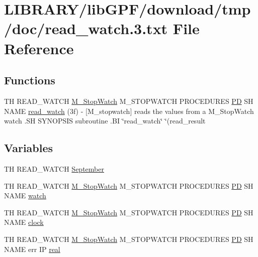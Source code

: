 \hypertarget{read__watch_83_8txt}{}\section{L\+I\+B\+R\+A\+R\+Y/lib\+G\+P\+F/download/tmp/doc/read\+\_\+watch.3.txt File Reference}
\label{read__watch_83_8txt}
\subsection*{Functions}
\begin{DoxyCompactItemize}
\item 
TH R\+E\+A\+D\+\_\+\+W\+A\+T\+CH \hyperlink{option__stopwatch_83_8txt_aa2011fc45a5e502e87ee50996a8a9305}{M\+\_\+\+Stop\+Watch} M\+\_\+\+S\+T\+O\+P\+W\+A\+T\+CH P\+R\+O\+C\+E\+D\+U\+R\+ES \hyperlink{what__overview_81_8txt_a85f26da5a4481fbdb0d9c79f2b94de3e}{PD} SH N\+A\+ME \hyperlink{read__watch_83_8txt_a9a59c617348dee220b1c77cbc6d39050}{read\+\_\+watch} (3f) -\/ \mbox{[}\+M\+\_\+stopwatch\mbox{]} reads the values from a M\+\_\+\+Stop\+Watch watch .\+S\+H S\+Y\+N\+O\+P\+S\+I\+S subroutine .\+B\+I \char`\"{}read\+\_\+watch\char`\"{} \char`\"{}(read\+\_\+result
\end{DoxyCompactItemize}
\subsection*{Variables}
\begin{DoxyCompactItemize}
\item 
TH R\+E\+A\+D\+\_\+\+W\+A\+T\+CH \hyperlink{read__watch_83_8txt_a01edc0babc2c7bff9f6dea0d461744bc}{September}
\item 
TH R\+E\+A\+D\+\_\+\+W\+A\+T\+CH \hyperlink{option__stopwatch_83_8txt_aa2011fc45a5e502e87ee50996a8a9305}{M\+\_\+\+Stop\+Watch} M\+\_\+\+S\+T\+O\+P\+W\+A\+T\+CH P\+R\+O\+C\+E\+D\+U\+R\+ES \hyperlink{what__overview_81_8txt_a85f26da5a4481fbdb0d9c79f2b94de3e}{PD} SH N\+A\+ME \hyperlink{read__watch_83_8txt_ad2129669fa47b8899641309620add095}{watch}
\item 
TH R\+E\+A\+D\+\_\+\+W\+A\+T\+CH \hyperlink{option__stopwatch_83_8txt_aa2011fc45a5e502e87ee50996a8a9305}{M\+\_\+\+Stop\+Watch} M\+\_\+\+S\+T\+O\+P\+W\+A\+T\+CH P\+R\+O\+C\+E\+D\+U\+R\+ES \hyperlink{what__overview_81_8txt_a85f26da5a4481fbdb0d9c79f2b94de3e}{PD} SH N\+A\+ME \hyperlink{read__watch_83_8txt_a6b8c46608167c7c707dcc341e6a30f47}{clock}
\item 
TH R\+E\+A\+D\+\_\+\+W\+A\+T\+CH \hyperlink{option__stopwatch_83_8txt_aa2011fc45a5e502e87ee50996a8a9305}{M\+\_\+\+Stop\+Watch} M\+\_\+\+S\+T\+O\+P\+W\+A\+T\+CH P\+R\+O\+C\+E\+D\+U\+R\+ES \hyperlink{what__overview_81_8txt_a85f26da5a4481fbdb0d9c79f2b94de3e}{PD} SH N\+A\+ME err IP \hyperlink{read__watch_83_8txt_abdb62bde002f38ef75f810d3a905a823}{real}
\end{DoxyCompactItemize}



